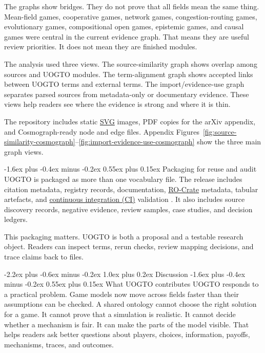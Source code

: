 \documentclass[11pt]{article}
\makeatletter
\renewcommand\section{\@startsection{section}{1}{\z@}%
  {-2.2ex plus -0.6ex minus -0.2ex}%
  {1.0ex plus 0.2ex}%
  {\normalfont\Large\bfseries\color{uogtoInk}}}
\renewcommand\subsection{\@startsection{subsection}{2}{\z@}%
  {-1.6ex plus -0.4ex minus -0.2ex}%
  {0.55ex plus 0.15ex}%
  {\normalfont\large\bfseries\color{uogtoInk}}}
\newcommand{\abblink}[2]{\hyperlink{abbr:#1}{#2}}
\makeatother
\begin{document}
The graphs show bridges. They do not prove that all fields mean the same thing. Mean-field games, cooperative games, network games, congestion-routing games, evolutionary games, compositional open games, epistemic games, and causal games were central in the current evidence graph. That means they are useful review priorities. It does not mean they are finished modules.

The analysis used three views. The source-similarity graph shows overlap among sources and UOGTO modules. The term-alignment graph shows accepted links between UOGTO terms and external terms. The import/evidence-use graph separates parsed sources from metadata-only or documentary evidence. These views help readers see where the evidence is strong and where it is thin.

The repository includes static \abblink{svg}{SVG} images, PDF copies for the arXiv appendix, and Cosmograph-ready node and edge files. Appendix Figures~\ref{fig:source-similarity-cosmograph}--\ref{fig:import-evidence-use-cosmograph} show the three main graph views.

\subsection{Packaging for reuse and audit}
UOGTO is packaged as more than one vocabulary file. The release includes citation metadata, registry records, documentation, \abblink{rocrate}{RO-Crate} metadata, tabular artefacts, and \abblink{ci}{continuous integration (CI)} validation \cite{ro-crate-2022,widoco-2017}. It also includes source discovery records, negative evidence, review samples, case studies, and decision ledgers.

This packaging matters. UOGTO is both a proposal and a testable research object. Readers can inspect terms, rerun checks, review mapping decisions, and trace claims back to files.

\section{Discussion}
\subsection{What UOGTO contributes}
UOGTO responds to a practical problem. Game models now move across fields faster than their assumptions can be checked. A shared ontology cannot choose the right solution for a game. It cannot prove that a simulation is realistic. It cannot decide whether a mechanism is fair. It can make the parts of the model visible. That helps readers ask better questions about players, choices, information, payoffs, mechanisms, traces, and outcomes.
\end{document}
